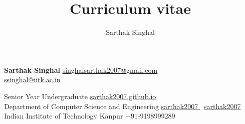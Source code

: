 \documentclass[9pt]{extarticle}
\title{Curriculum vitae}
\author{Sarthak Singhal}
\begin{document}

\begingroup
{}

{\fontsize{20pt}{1em}\textbf{\sc Sarthak Singhal}}
\hfill
{\large \href{mailto::singhalsarthak2007@gmail.com}{singhalsarthak2007@gmail.com}} \faEnvelope \\
\hfill
{\large \href{mailto::ssinghal@iitk.ac.in}{ssinghal@iitk.ac.in}} \faEnvelope

{\large Senior Year Undergraduate}
\hfill
{\large \href{http://sarthak2007.github.io}{sarthak2007.github.io \faHome}}\\

{\large Department of Computer Science and Engineering}
\hfill
{\large \href{https://github.com/sarthak2007}{sarthak2007 \faGithub}} \textbar \ 
{\large \href{https://www.linkedin.com/in/sarthak2007/}{sarthak2007 \faLinkedin}} \\

{\large Indian Institute of Technology Kanpur}
\hfill
{\large +91-9198999289 \faMobile} \\
{
}
\begin{minipage}[t]{0.49\textwidth}
  \vspace{3.2mm}
  
	\vspace{2mm}
  
  
  
\end{minipage}
\hfill
\begin{minipage}[t]{0.49\textwidth}
  \vspace{3.2mm}
  
  
  
\end{minipage}

\endgroup
\end{document}

